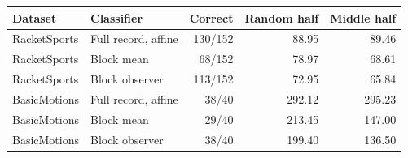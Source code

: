 \begin{tabular}{llrrr}\toprule
Dataset & Classifier & Correct & Random half & Middle half \\\midrule
RacketSports & Full record, affine & 130/152 & 88.95 & 89.46 \\
RacketSports & Block mean & 68/152 & 78.97 & 68.61 \\
RacketSports & Block observer & 113/152 & 72.95 & 65.84 \\
BasicMotions & Full record, affine & 38/40 & 292.12 & 295.23 \\
BasicMotions & Block mean & 29/40 & 213.45 & 147.00 \\
BasicMotions & Block observer & 38/40 & 199.40 & 136.50 \\
\bottomrule\end{tabular}
